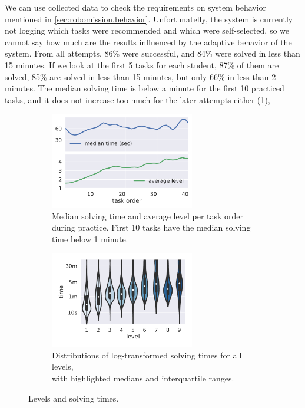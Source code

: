 We can use collected data to check the requirements on system behavior mentioned in
\cref{sec:robomission.behavior}. Unfortunatelly, the system is currently not logging
which tasks were recommended and which were self-selected, so we cannot say
how much are the results influenced by the adaptive behavior of the system.
From all attempts, 86\% were successful, and 84\% were solved in less than 15 minutes.
If we look at the first 5 tasks for each student, 87\% of them are solved,
85\% are solved in less than 15 minutes, but only 66\% in less than 2 minutes.
The median solving time is below a minute for the first 10 practiced tasks,
and it does not increase too much for the later attempts either (\cref{fig:solving-times}),

\begin{figure}[htb]
\centering
\begin{subfigure}{.48\textwidth}
\centering
\includegraphics[height=42mm]{img/median-time-order}
\caption{Median solving time and average level per task order during practice.
  First 10 tasks have the median solving time below 1 minute.}
\end{subfigure}
\begin{subfigure}{.51\textwidth}
\centering
\includegraphics[height=42mm]{img/levels-time}
\caption{Distributions of log-transformed solving times for all levels,\\
         with highlighted medians and interquartile ranges.}
\end{subfigure}
\caption{Levels and solving times.}
\label{fig:solving-times}
\end{figure}


